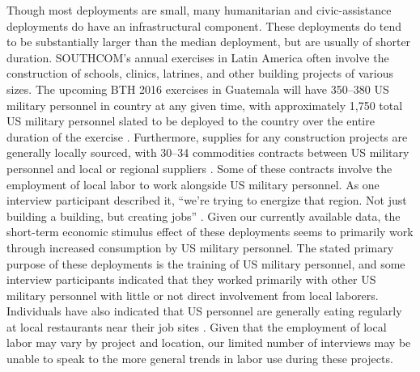 \documentclass[12pt]{article}
\begin{document}
\begin{doublespace}
Though most deployments are small, many humanitarian and civic-assistance deployments do have an infrastructural component. These deployments do tend to be substantially larger than the median deployment, but are usually of shorter duration. SOUTHCOM's annual exercises in Latin America often involve the construction of schools, clinics, latrines, and other building projects of various sizes. The upcoming BTH 2016 exercises in Guatemala will have 350--380 US military personnel in country at any given time, with approximately 1,750 total US military personnel slated to be deployed to the country over the entire duration of the exercise \cite{CPT20160309}. Furthermore, supplies for any construction projects are generally locally sourced, with 30--34 commodities contracts between US military personnel and local or regional suppliers \cite{CPT20160309}. Some of these contracts involve the employment of local labor to work alongside US military personnel. As one interview participant described it, ``we're trying to energize that region. Not just building a building, but creating jobs'' \cite{CPT20160309}. Given our currently available data, the short-term economic stimulus effect of these deployments seems to primarily work through increased consumption by US military personnel. The stated primary purpose of these deployments is the training of US military personnel, and some interview participants indicated that they worked primarily with other US military personnel with little or not direct involvement from local laborers. Individuals have also indicated that US personnel are generally eating regularly at local restaurants near their job sites \cite{SFC20160226,SFC20160308}. Given that the employment of local labor may vary by project and location, our limited number of interviews may be unable to speak to the more general trends in labor use during these projects.




\end{doublespace}
\end{document}
